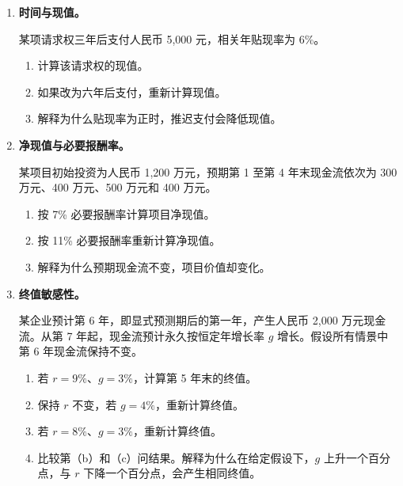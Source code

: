 \begin{enumerate}

\item \textbf{时间与现值。}

某项请求权三年后支付人民币 5,000 元，相关年贴现率为 6\%。

\begin{enumerate}

\item 计算该请求权的现值。

\item 如果改为六年后支付，重新计算现值。

\item 解释为什么贴现率为正时，推迟支付会降低现值。

\end{enumerate}


\item \textbf{净现值与必要报酬率。}

某项目初始投资为人民币 1,200 万元，预期第 1 至第 4 年末现金流依次为 300 万元、400 万元、500 万元和 400 万元。

\begin{enumerate}

\item 按 7\% 必要报酬率计算项目净现值。

\item 按 11\% 必要报酬率重新计算净现值。

\item 解释为什么预期现金流不变，项目价值却变化。

\end{enumerate}


\item \textbf{终值敏感性。}

某企业预计第 6 年，即显式预测期后的第一年，产生人民币 2,000 万元现金流。从第 7 年起，现金流预计永久按恒定年增长率 \(g\) 增长。假设所有情景中第 6 年现金流保持不变。

\begin{enumerate}

\item 若 $r=9\%$、$g=3\%$，计算第 5 年末的终值。

\item 保持 $r$ 不变，若 $g=4\%$，重新计算终值。

\item 若 $r=8\%$、$g=3\%$，重新计算终值。

\item 比较第（b）和（c）问结果。解释为什么在给定假设下，$g$ 上升一个百分点，与 $r$ 下降一个百分点，会产生相同终值。


\end{enumerate}
\end{enumerate}
